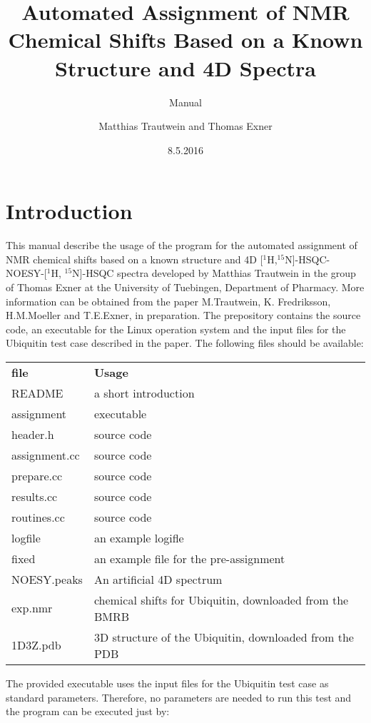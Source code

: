 \documentclass{scrartcl}
\begin{document}
\title{ Automated Assignment of NMR Chemical Shifts Based on a Known Structure and 4D Spectra}
\subtitle{Manual}
\author{Matthias Trautwein and Thomas Exner}
\date{8.5.2016}
\maketitle
\section{Introduction}
This manual describe the usage of the program for the automated assignment of NMR chemical shifts based on a known structure and 4D [$^1$H,$^{15}$N]-HSQC-NOESY-[$^1$H, $^{15}$N]-HSQC  spectra developed by Matthias Trautwein in the group of Thomas Exner at the University of Tuebingen, Department of Pharmacy.  More information can be obtained from the paper M.Trautwein, K. Fredriksson, H.M.Moeller and T.E.Exner, in preparation. The prepository contains the source code, an executable for the Linux operation system and the input files for the Ubiquitin test case described in the paper.
\noindent
The following files should be available:
\begin{table}[htbp]
\begin{center}
\begin{tabular}{ll}
\textbf{file} & \textbf{Usage} \\
README     & a short introduction \\
assignment & executable \\
header.h   & source code \\
assignment.cc & source code \\
prepare.cc  & source code \\
results.cc  & source code \\
routines.cc & source code \\
logfile     & an example logifle \\
fixed       & an example file for the pre-assignment \\
NOESY.peaks & An artificial 4D spectrum \\
exp.nmr   & chemical shifts for Ubiquitin, downloaded from the BMRB \\
1D3Z.pdb  & 3D structure of the Ubiquitin, downloaded from the PDB
\end{tabular}
\end{center}
\end{table}

The provided executable uses the input files for the Ubiquitin test case as standard parameters. Therefore, no parameters are needed to run this test and the program can be executed just by: 
\end{document}
